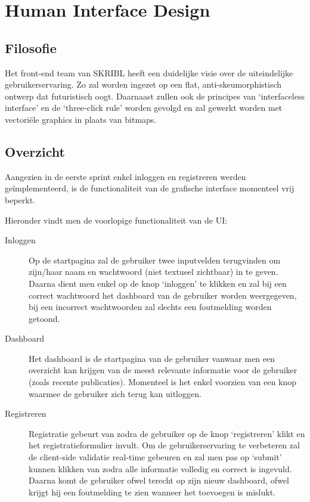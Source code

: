 \documentclass{article}
\begin{document}
\clearpage

\section{Human Interface Design}

\subsection{Filosofie}

Het front-end team van SKRIBL heeft een duidelijke visie over de uiteindelijke gebruikerservaring. Zo zal worden ingezet op een flat, anti-skeumorphistisch ontwerp dat futuristisch oogt. Daarnaast zullen ook de principes van `interfaceless interface' en de `three-click rule' worden gevolgd en zal gewerkt worden met vectori\"ele graphics in plaats van bitmaps.

\subsection{Overzicht}

Aangezien in de eerste sprint enkel inloggen en registreren werden ge\"implementeerd, is de functionaliteit van de grafische interface momenteel vrij beperkt. 

Hieronder vindt men de voorlopige functionaliteit van de UI:

\begin{description}

\item[Inloggen] Op de startpagina zal de gebruiker twee inputvelden terugvinden om zijn/haar naam en wachtwoord (niet textueel zichtbaar) in te geven. Daarna dient men enkel op de knop `inloggen' te klikken en zal bij een correct wachtwoord het dashboard van de gebruiker worden weergegeven, bij een incorrect wachtwoorden zal slechts een foutmelding worden getoond.

\item[Dashboard] Het dashboard is de startpagina van de gebruiker vanwaar men een overzicht kan krijgen van de meest relevante informatie voor de gebruiker (zoals recente publicaties). Momenteel is het enkel voorzien van een knop waarmee de gebruiker zich terug kan uitloggen.

\item[Registreren] Registratie gebeurt van zodra de gebruiker op de knop `registreren' klikt en het registratieformulier invult. Om de gebruikerservaring te verbeteren zal de client-side validatie real-time gebeuren en zal men pas op `submit' kunnen klikken van zodra alle informatie volledig en correct is ingevuld. Daarna komt de gebruiker ofwel terecht op zijn nieuw dashboard, ofwel krijgt hij een foutmelding te zien wanneer het toevoegen is mislukt.

\end{description}
\end{document}
